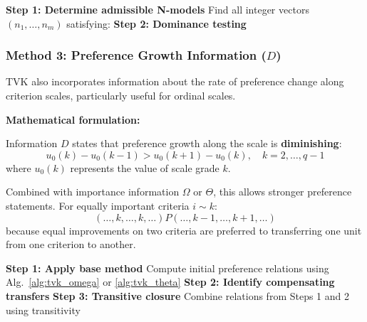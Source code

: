 \documentclass[conference]{IEEEtran}
\begin{document}
\begin{algorithm}
	\caption{TVK Method with Interval Importance ($\Theta$)}
	\label{alg:tvk_theta}
	\SetAlgoLined
	\textbf{Step 1: Determine admissible N-models}\;
	Find all integer vectors $(n_1, \ldots, n_m)$ satisfying:\;
	\textbf{Step 2: Dominance testing}\;
\end{algorithm}

\subsubsection{Method 3: Preference Growth Information ($D$)}

TVK also incorporates information about the rate of preference change along criterion scales, particularly useful for ordinal scales.

\textbf{Mathematical formulation:}

Information $D$ states that preference growth along the scale is \textbf{diminishing}:
\begin{equation}
	u_0(k) - u_0(k-1) > u_0(k+1) - u_0(k), \quad k = 2, \ldots, q-1
\end{equation}
where $u_0(k)$ represents the value of scale grade $k$.

Combined with importance information $\Omega$ or $\Theta$, this allows stronger preference statements. For equally important criteria $i \sim k$:
\begin{equation}
	(\ldots, k, \ldots, k, \ldots) P (\ldots, k-1, \ldots, k+1, \ldots)
\end{equation}
because equal improvements on two criteria are preferred to transferring one unit from one criterion to another.

\begin{algorithm}
	\caption{TVK Method with Preference Growth Information ($D$)}
	\label{alg:tvk_d}
	\SetAlgoLined
	\textbf{Step 1: Apply base method}\;
	Compute initial preference relations using Alg.~\ref{alg:tvk_omega} or \ref{alg:tvk_theta}\;
	\textbf{Step 2: Identify compensating transfers}\;
	\textbf{Step 3: Transitive closure}\;
	Combine relations from Steps 1 and 2 using transitivity\;
	\;
\end{algorithm}
\end{document}
